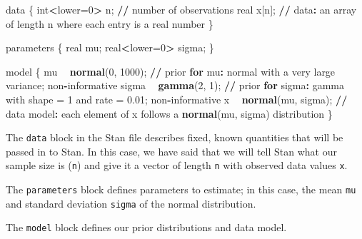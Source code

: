 \documentclass[]{article}
\newenvironment{Shaded}{\begin{snugshade}}{\end{snugshade}}
\newcommand{\KeywordTok}[1]{\textcolor[rgb]{0.13,0.29,0.53}{\textbf{#1}}}
\newcommand{\DecValTok}[1]{\textcolor[rgb]{0.00,0.00,0.81}{#1}}
\newcommand{\FloatTok}[1]{\textcolor[rgb]{0.00,0.00,0.81}{#1}}
\newcommand{\StringTok}[1]{\textcolor[rgb]{0.31,0.60,0.02}{#1}}
\newcommand{\ControlFlowTok}[1]{\textcolor[rgb]{0.13,0.29,0.53}{\textbf{#1}}}
\newcommand{\OperatorTok}[1]{\textcolor[rgb]{0.81,0.36,0.00}{\textbf{#1}}}
\newcommand{\ErrorTok}[1]{\textcolor[rgb]{0.64,0.00,0.00}{\textbf{#1}}}
\newcommand{\NormalTok}[1]{#1}
\begin{document}
\begin{Shaded}
\begin{Highlighting}[]
\NormalTok{data \{}
\NormalTok{  int}\OperatorTok{<}\NormalTok{lower=}\DecValTok{0}\OperatorTok{>}\StringTok{ }\NormalTok{n; }\OperatorTok{/}\ErrorTok{/}\StringTok{ }\NormalTok{number of observations}
\NormalTok{  real x[n]; }\OperatorTok{/}\ErrorTok{/}\StringTok{ }\NormalTok{data}\OperatorTok{:}\StringTok{ }\NormalTok{an array of length n where each entry is a real number}
\NormalTok{\}}

\NormalTok{parameters \{}
\NormalTok{  real mu;}
\NormalTok{  real}\OperatorTok{<}\NormalTok{lower=}\DecValTok{0}\OperatorTok{>}\StringTok{ }\NormalTok{sigma;}
\NormalTok{\}}

\NormalTok{model \{}
\NormalTok{  mu }\OperatorTok{~}\StringTok{ }\KeywordTok{normal}\NormalTok{(}\DecValTok{0}\NormalTok{, }\DecValTok{1000}\NormalTok{); }\OperatorTok{/}\ErrorTok{/}\StringTok{ }\NormalTok{prior }\ControlFlowTok{for}\NormalTok{ mu}\OperatorTok{:}\StringTok{ }\NormalTok{normal with a very large variance; non}\OperatorTok{-}\NormalTok{informative}
\NormalTok{  sigma }\OperatorTok{~}\StringTok{ }\KeywordTok{gamma}\NormalTok{(}\DecValTok{2}\NormalTok{, }\DecValTok{1}\NormalTok{); }\OperatorTok{/}\ErrorTok{/}\StringTok{ }\NormalTok{prior }\ControlFlowTok{for}\NormalTok{ sigma}\OperatorTok{:}\StringTok{ }\NormalTok{gamma with shape =}\StringTok{ }\DecValTok{1}\NormalTok{ and rate =}\StringTok{ }\FloatTok{0.01}\NormalTok{; non}\OperatorTok{-}\NormalTok{informative}
\NormalTok{  x }\OperatorTok{~}\StringTok{ }\KeywordTok{normal}\NormalTok{(mu, sigma); }\OperatorTok{/}\ErrorTok{/}\StringTok{ }\NormalTok{data model}\OperatorTok{:}\StringTok{ }\NormalTok{each element of x follows a }\KeywordTok{normal}\NormalTok{(mu, sigma) distribution}
\NormalTok{\}}
\end{Highlighting}
\end{Shaded}

The \texttt{data} block in the Stan file describes fixed, known
quantities that will be passed in to Stan. In this case, we have said
that we will tell Stan what our sample size is (\texttt{n}) and give it
a vector of length \texttt{n} with observed data values \texttt{x}.

The \texttt{parameters} block defines parameters to estimate; in this
case, the mean \texttt{mu} and standard deviation \texttt{sigma} of the
normal distribution.

The \texttt{model} block defines our prior distributions and data model.
\end{document}
